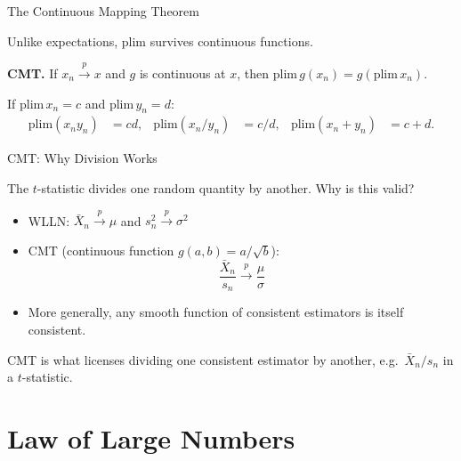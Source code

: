 \documentclass[handout, aspectratio=169]{beamer}
\numberwithin{equation}{section}
\begin{document}

\begin{frame}{The Continuous Mapping Theorem}

Unlike expectations, plim survives continuous functions.

\begin{tcolorbox}
\textbf{CMT.} If $x_n \overset{p}{\to} x$ and $g$ is continuous at $x$, then $\text{plim}\,g(x_n) = g(\text{plim}\,x_n)$.

\medskip
If $\text{plim}\,x_n = c$ and $\text{plim}\,y_n = d$:
\begin{align*}
\text{plim}(x_n y_n) &= cd, &
\text{plim}(x_n / y_n) &= c/d, &
\text{plim}(x_n + y_n) &= c + d.
\end{align*}
\end{tcolorbox}

\end{frame}


\begin{frame}{CMT: Why Division Works}

The $t$-statistic divides one random quantity by another. Why is this valid?

\begin{itemize}
\item WLLN: $\bar{X}_n \overset{p}{\to} \mu$ \quad and \quad $s_n^2 \overset{p}{\to} \sigma^2$
\item CMT (continuous function $g(a,b) = a/\sqrt{b}$):
\[
\frac{\bar{X}_n}{s_n} \overset{p}{\to} \frac{\mu}{\sigma}
\]
\item More generally, any smooth function of consistent estimators is itself consistent.
\end{itemize}

\pause

\begin{tcolorbox}[colback=blue!5, colframe=blue!50]
CMT is what licenses dividing one consistent estimator by another, e.g.\ $\bar X_n / s_n$ in a $t$-statistic.
\end{tcolorbox}

\end{frame}

\section{Law of Large Numbers}
\end{document}

